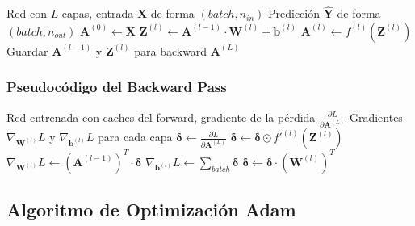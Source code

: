 \documentclass[a4paper,11pt]{article}
\begin{document}
\begin{algorithm}[H]
\caption{Forward Pass}
\begin{algorithmic}[1]
\Require Red con $L$ capas, entrada $\mathbf{X}$ de forma $(batch, n_{in})$
\Ensure Predicción $\hat{\mathbf{Y}}$ de forma $(batch, n_{out})$
\State $\mathbf{A}^{(0)} \gets \mathbf{X}$ 
    \State $\mathbf{Z}^{(l)} \gets \mathbf{A}^{(l-1)} \cdot \mathbf{W}^{(l)} + \mathbf{b}^{(l)}$ 
    \State $\mathbf{A}^{(l)} \gets f^{(l)}(\mathbf{Z}^{(l)})$ 
    \State Guardar $\mathbf{A}^{(l-1)}$ y $\mathbf{Z}^{(l)}$ para backward
\EndFor
\State \Return $\mathbf{A}^{(L)}$
\end{algorithmic}
\end{algorithm}

\subsubsection{Pseudocódigo del Backward Pass}

\begin{algorithm}[H]
\caption{Backward Pass (Backpropagation)}
\begin{algorithmic}[1]
\Require Red entrenada con caches del forward, gradiente de la pérdida $\frac{\partial L}{\partial \mathbf{A}^{(L)}}$
\Ensure Gradientes $\nabla_{\mathbf{W}^{(l)}} L$ y $\nabla_{\mathbf{b}^{(l)}} L$ para cada capa
\State $\boldsymbol{\delta} \gets \frac{\partial L}{\partial \mathbf{A}^{(L)}}$ 
        \State $\boldsymbol{\delta} \gets \boldsymbol{\delta} \odot f'^{(l)}(\mathbf{Z}^{(l)})$ 
    \EndIf
    \State $\nabla_{\mathbf{W}^{(l)}} L \gets (\mathbf{A}^{(l-1)})^T \cdot \boldsymbol{\delta}$ 
    \State $\nabla_{\mathbf{b}^{(l)}} L \gets \sum_{batch} \boldsymbol{\delta}$ 
    \State $\boldsymbol{\delta} \gets \boldsymbol{\delta} \cdot (\mathbf{W}^{(l)})^T$ 
\EndFor
\end{algorithmic}
\end{algorithm}

\subsection{Algoritmo de Optimización Adam}
\end{document}
